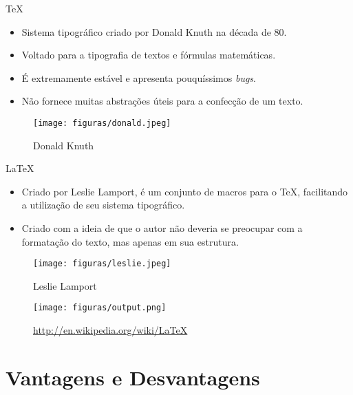\begin{frame}{\TeX{}}
    \begin{itemize}
        \item Sistema tipográfico criado por Donald Knuth na década de 80.
        \item Voltado para a tipografia de textos e fórmulas matemáticas.
        \item É extremamente estável e apresenta pouquíssimos \textit{bugs}.
        \item Não fornece muitas abstrações úteis para a confecção de um texto.
    \end{itemize}
\begin{figure}[htbp]
    \centering
    \texttt{[image: figuras/donald.jpeg]}
    \caption{Donald Knuth}
    \label{fig:tipografia}
\end{figure}
\end{frame}

\begin{frame}{\LaTeX{}}
    \begin{itemize}
        \item Criado por Leslie Lamport, é um conjunto de macros para o \TeX{}, facilitando a utilização de seu sistema tipográfico.
        \item Criado com a ideia de que o autor não deveria se preocupar com a formatação do texto, mas apenas em sua estrutura.
    \end{itemize}
    \begin{figure}[htbp]
    \centering
    \texttt{[image: figuras/leslie.jpeg]}
    \caption{Leslie Lamport}
    \label{fig:leslie}
\end{figure}
\end{frame}

\begin{frame}
\begin{figure}[htbp]
    \centering
        \texttt{[image: figuras/output.png]}
    \caption{\url{http://en.wikipedia.org/wiki/LaTeX}}
    \label{fig:output}
\end{figure}
\end{frame}

\section{Vantagens e Desvantagens}
